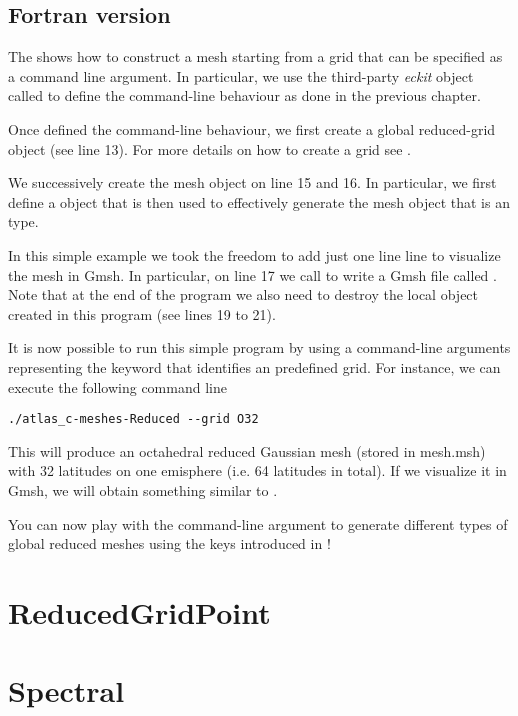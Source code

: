 \subsection{Fortran version}
The  shows how to construct a mesh 
starting from a grid that can be specified as a command 
line argument. In particular, we use the third-party 
\textit{eckit} object called  to define 
the command-line behaviour as done in the previous chapter. 

Once defined the command-line behaviour, we first create 
a global reduced-grid object (see line 13). For more 
details on how to create a grid see .

We successively create the mesh object on line 15 and 16.
In particular, we first define a  
object that is then used to effectively generate the mesh object 
 that is an  type.

In this simple example we took the freedom to add just one line 
line to visualize the mesh in Gmsh. In particular, on line 17 
we call  to write a Gmsh file called 
. Note that at the end of the program we also 
need to destroy the local object created in this program (see 
lines 19 to 21).

It is now possible to run this simple program by using 
a command-line arguments representing the keyword that 
identifies an \Atlas predefined grid. For instance, 
we can execute the following command line
%
\begin{lstlisting}[style=BashStyle]
./atlas_c-meshes-Reduced --grid O32
\end{lstlisting}
% 
This will produce an octahedral reduced Gaussian mesh 
(stored in mesh.msh) with 32 latitudes on one emisphere 
(i.e. 64 latitudes in total).
If we visualize it in Gmsh, we will obtain something similar
to .

You can now play with the command-line argument to generate 
different types of global reduced meshes using the keys 
introduced in !
\section{ReducedGridPoint}
\section{Spectral}

